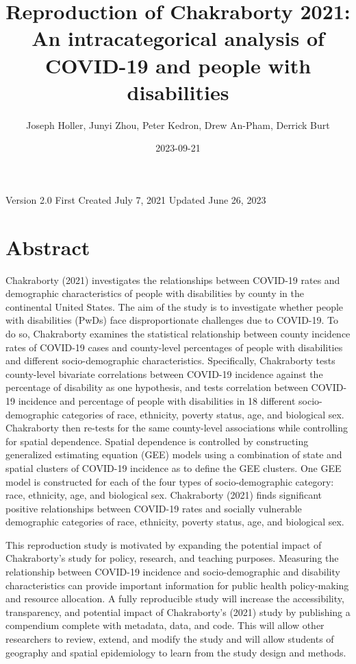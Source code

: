 \documentclass[
]{article}
\title{Reproduction of Chakraborty 2021: An intracategorical analysis of
COVID-19 and people with disabilities}
\author{Joseph Holler, Junyi Zhou, Peter Kedron, Drew An-Pham, Derrick
Burt}
\date{2023-09-21}
\begin{document}
\maketitle

Version 2.0 \textbar{} First Created July 7, 2021 \textbar{} Updated
June 26, 2023

\hypertarget{abstract}{%
\section{Abstract}\label{abstract}}

Chakraborty (2021) investigates the relationships between COVID-19 rates
and demographic characteristics of people with disabilities by county in
the continental United States. The aim of the study is to investigate
whether people with disabilities (PwDs) face disproportionate challenges
due to COVID-19. To do so, Chakraborty examines the statistical
relationship between county incidence rates of COVID-19 cases and
county-level percentages of people with disabilities and different
socio-demographic characteristics. Specifically, Chakraborty tests
county-level bivariate correlations between COVID-19 incidence against
the percentage of disability as one hypothesis, and tests correlation
between COVID-19 incidence and percentage of people with disabilities in
18 different socio-demographic categories of race, ethnicity, poverty
status, age, and biological sex. Chakraborty then re-tests for the same
county-level associations while controlling for spatial dependence.
Spatial dependence is controlled by constructing generalized estimating
equation (GEE) models using a combination of state and spatial clusters
of COVID-19 incidence as to define the GEE clusters. One GEE model is
constructed for each of the four types of socio-demographic category:
race, ethnicity, age, and biological sex. Chakraborty (2021) finds
significant positive relationships between COVID-19 rates and socially
vulnerable demographic categories of race, ethnicity, poverty status,
age, and biological sex.

This reproduction study is motivated by expanding the potential impact
of Chakraborty's study for policy, research, and teaching purposes.
Measuring the relationship between COVID-19 incidence and
socio-demographic and disability characteristics can provide important
information for public health policy-making and resource allocation. A
fully reproducible study will increase the accessibility, transparency,
and potential impact of Chakraborty's (2021) study by publishing a
compendium complete with metadata, data, and code. This will allow other
researchers to review, extend, and modify the study and will allow
students of geography and spatial epidemiology to learn from the study
design and methods.
\end{document}
